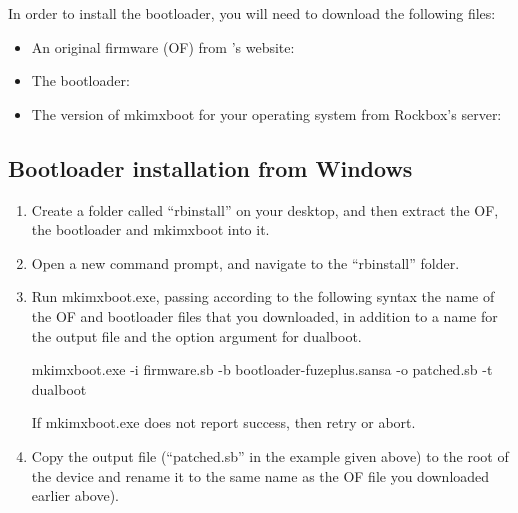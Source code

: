 
In order to install the bootloader, you will need to download the following
files:

\begin{itemize}
  \item An original firmware (OF) from \playerman's website:

  \item The bootloader:

  \item The version of mkimxboot for your operating system from Rockbox's server:
\end{itemize}

\subsection{Bootloader installation from Windows}

\begin{enumerate}

\item Create a folder called ``rbinstall'' on your desktop, and then extract
  the OF, the bootloader and mkimxboot into it.

\item Open a new command prompt, and navigate to the ``rbinstall'' folder.

\item Run mkimxboot.exe, passing according to the following syntax the name
  of the OF and bootloader files that you downloaded, in addition to a name for
  the output file and the option argument for dualboot.

  \begin{code}[firstline=\opt{fuzeplus}{1},%
               lastline=\opt{fuzeplus}{1}]
    mkimxboot.exe -i firmware.sb -b bootloader-fuzeplus.sansa -o patched.sb -t dualboot
  \end{code}

  If mkimxboot.exe does not report success, then retry or abort.

  \item Copy the output file (``patched.sb'' in the example given above) to the
    root of the device and rename it to the same name as the OF file you downloaded earlier
      above).

\end{enumerate}

